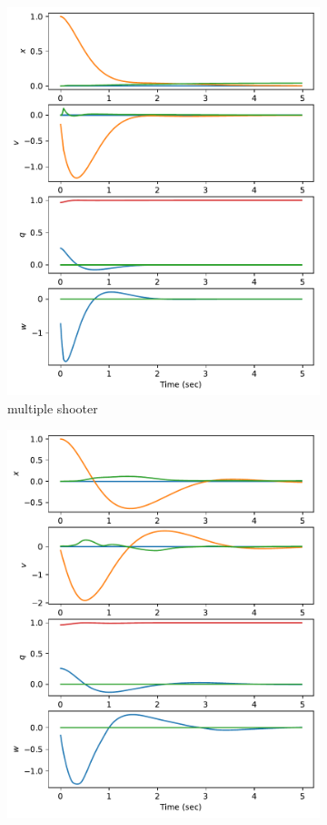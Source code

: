 \documentclass[]{article}
\begin{document}
\begin{figure}[H]
\begin{subfigure}[b]{0.3\textwidth}
		\includegraphics[width=\textwidth]{statey115dx3.pdf}
		\caption{multiple shooter}
	\end{subfigure}
	\begin{subfigure}[b]{0.3\textwidth}
		\centering
		\includegraphics[width=\textwidth]{statey115dx2.pdf}

\end{subfigure}
\end{figure}
\end{document}
